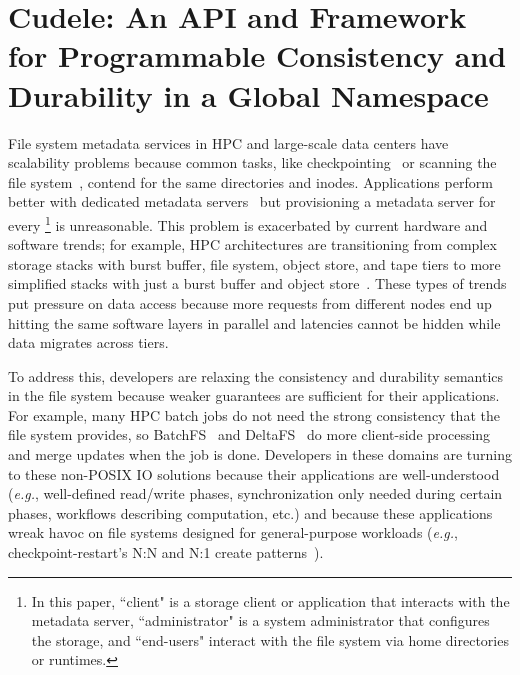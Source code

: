 \chapter{Cudele: An API and Framework for Programmable Consistency and
Durability in a Global Namespace}
\label{chp:cudele}

File system metadata services in HPC and large-scale data centers have
scalability problems because common tasks, like
checkpointing~\cite{bent_plfs_2009} or scanning the file
system~\cite{zheng:pdsw2014-batchfs}, contend for the same directories and
inodes. Applications perform better with dedicated metadata
servers~\cite{sevilla:sc15-mantle, ren:sc2014-indexfs} but provisioning a
metadata server for every \footnote{In this paper, ``client"
is a storage client or application that interacts with the metadata server,
``administrator" is a system administrator that configures the storage, and
``end-users" interact with the file system via home directories or runtimes.  }
is unreasonable. This problem is exacerbated by current hardware and software
trends; for example,  HPC architectures are transitioning from complex storage
stacks with burst buffer, file system, object store, and tape tiers to more
simplified stacks with just a burst buffer and object
store~\cite{bent:login16-hpc-trends}. These types of trends put pressure on
data access because more requests from different nodes end up hitting the same
software layers in parallel and latencies cannot be hidden while data migrates
across tiers.

To address this, developers are relaxing the consistency and durability
semantics in the file system because weaker guarantees are sufficient for their
applications. For example, many HPC batch jobs do not need the strong
consistency that the file system provides, so
BatchFS~\cite{zheng:pdsw2014-batchfs} and DeltaFS~\cite{zheng:pdsw2015-deltafs}
do more client-side processing and merge updates when the job is done.
Developers in these domains are turning to these non-POSIX IO solutions because
their applications are well-understood ({\it e.g.}, well-defined read/write
phases, synchronization only needed during certain phases, workflows describing
computation, etc.) and because these applications wreak havoc on file systems
designed for general-purpose workloads ({\it e.g.}, checkpoint-restart's N:N
and N:1 create patterns~\cite{bent_plfs_2009}).

